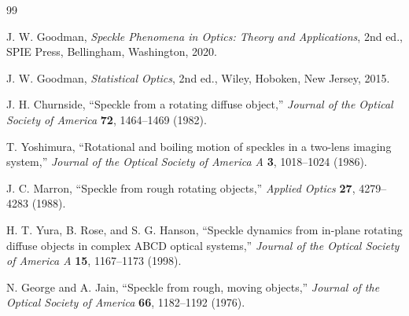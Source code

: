 \documentclass[11pt]{article}
\begin{document}
\begin{thebibliography}{99}

J. W. Goodman,
\textit{Speckle Phenomena in Optics: Theory and Applications},
2nd ed.,
SPIE Press, Bellingham, Washington, 2020.

J. W. Goodman,
\textit{Statistical Optics},
2nd ed.,
Wiley, Hoboken, New Jersey, 2015.

J. H. Churnside,
``Speckle from a rotating diffuse object,''
\textit{Journal of the Optical Society of America}
\textbf{72}, 1464--1469 (1982).

T. Yoshimura,
``Rotational and boiling motion of speckles in a two-lens imaging system,''
\textit{Journal of the Optical Society of America A}
\textbf{3}, 1018--1024 (1986).

J. C. Marron,
``Speckle from rough rotating objects,''
\textit{Applied Optics}
\textbf{27}, 4279--4283 (1988).

H. T. Yura, B. Rose, and S. G. Hanson,
``Speckle dynamics from in-plane rotating diffuse objects in complex
ABCD optical systems,''
\textit{Journal of the Optical Society of America A}
\textbf{15}, 1167--1173 (1998).

N. George and A. Jain,
``Speckle from rough, moving objects,''
\textit{Journal of the Optical Society of America}
\textbf{66}, 1182--1192 (1976).

\end{thebibliography}
\end{document}
